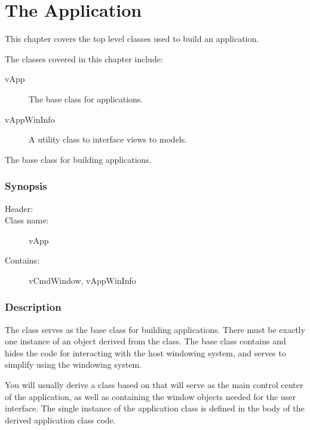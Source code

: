 
\chapter {The Application}

This chapter covers the top level classes used to build an application.

The classes covered in this chapter include:

\begin{description}
	\item[vApp] The base class for applications.
	\item[vAppWinInfo] A utility class to interface views to models.
\end{description}


The base class for building applications.

\subsection* {Synopsis}

\begin{description}
	\item [Header:] 
	\item [Class name:] vApp
	\item [Contains:] vCmdWindow, vAppWinInfo
\end{description}

\subsection* {Description}

The  class serves as the base class for building
applications. There must be exactly one instance of an object
derived from the  class.  The base class contains and
hides the code for interacting with the host windowing system,
and serves to simplify using the windowing system.

You will usually derive a class based on  that will
serve as the main control center of the application, as well as
containing the window objects needed for the user interface.
The single instance of the application class is defined
in the body of the derived application class code.

